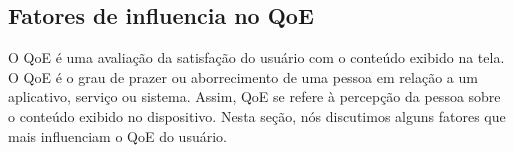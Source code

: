 %
%
%
%

\subsection{Fatores de influencia no QoE}

O QoE é uma avaliação da satisfação do usuário com o conteúdo exibido na tela. O QoE é o grau de prazer ou aborrecimento de uma pessoa em relação a um aplicativo, serviço ou sistema. Assim, QoE se refere à percepção da pessoa sobre o conteúdo exibido no dispositivo. Nesta seção, nós discutimos alguns fatores que mais influenciam o QoE do usuário. 

